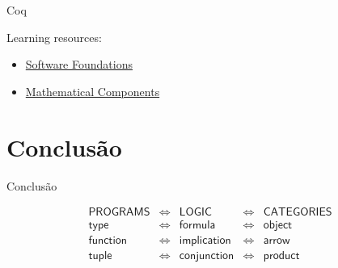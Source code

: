 \documentclass{beamer}
\begin{document}

\begin{frame}{Coq}

Learning resources:

\begin{itemize}
\item \href{https://softwarefoundations.cis.upenn.edu/}{Software Foundations}
\item \href{https://math-comp.github.io/mcb/}{Mathematical Components}
\end{itemize}

\end{frame}


\section{Conclusão}

\begin{frame}{Conclusão}

\begin{block}{}

\[
\begin{array}{rcccl}
\textsf{PROGRAMS} & \Longleftrightarrow & \textsf{LOGIC} & \Longleftrightarrow & \textsf{CATEGORIES}\\
\textsf{type} & \Longleftrightarrow & \textsf{formula} & \Longleftrightarrow & \textsf{object}\\
\textsf{function} & \Longleftrightarrow & \textsf{implication} & \Longleftrightarrow & \textsf{arrow}\\
\textsf{tuple} & \Longleftrightarrow & \textsf{conjunction} & \Longleftrightarrow & \textsf{product}\\
\end{array}
\]

\end{block}

\end{frame}



\end{document}
